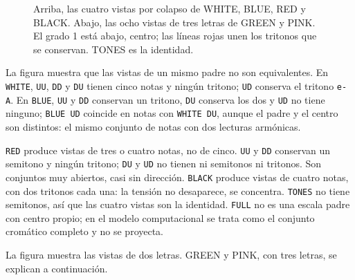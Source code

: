 \documentclass[]{report}
\begin{document}
\begin{figure}[p]
{
	}
	\caption{Arriba, las cuatro vistas por colapso de \textsf{WHITE},
	\textsf{BLUE}, \textsf{RED} y \textsf{BLACK}. Abajo, las ocho vistas de tres
	letras de \textsf{GREEN} y \textsf{PINK}. El grado 1 está abajo, centro; las
	líneas rojas unen los tritonos que se conservan. \textsf{TONES} es la
	identidad.}
	\label{tab:collapse-views}
\end{figure}

La figura muestra que las vistas de un mismo padre no son equivalentes. En
\texttt{WHITE}, \texttt{UU}, \texttt{DD} y \texttt{DU} tienen cinco notas y
ningún tritono; \texttt{UD} conserva el tritono \texttt{e-A}. En \texttt{BLUE},
\texttt{UU} y \texttt{DD} conservan un tritono, \texttt{DU} conserva los dos y
\texttt{UD} no tiene ninguno; \texttt{BLUE UD} coincide en notas con
\texttt{WHITE DU}, aunque el padre y el centro son distintos: el mismo conjunto
de notas con dos lecturas armónicas.

\texttt{RED} produce vistas de tres o cuatro notas, no de cinco.
\texttt{UU} y \texttt{DD} conservan un semitono y ningún tritono; \texttt{DU} y
\texttt{UD} no tienen ni semitonos ni tritonos. Son conjuntos muy abiertos, casi
sin dirección. \texttt{BLACK} produce vistas de cuatro notas, con dos tritonos
cada una: la tensión no desaparece, se concentra. \texttt{TONES} no tiene
semitonos, así que las cuatro vistas son la identidad. \texttt{FULL} no es una
escala padre con centro propio; en el modelo computacional se trata como el
conjunto cromático completo y no se proyecta.

La figura muestra las vistas de dos letras. \textsf{GREEN} y \textsf{PINK}, con
tres letras, se explican a continuación.
\end{document}
